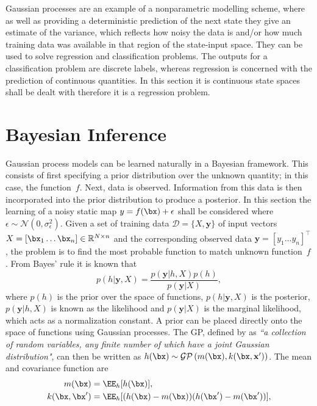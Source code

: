 Gaussian processes are an example of a nonparametric modelling scheme, where as well as providing a deterministic prediction of the next state they give an estimate of the variance, which reflects how noisy the data is and/or how much training data was available in that region of the state-input space. They can be used to solve regression and classification problems. The outputs for a classification problem are discrete labels, whereas regression is concerned with the prediction of continuous quantities. In this section it is continuous state spaces shall be dealt with therefore it is a regression problem.

\section{Bayesian Inference}
Gaussian process models can be learned naturally in a Bayesian framework. This consists of first specifying a prior distribution over the unknown quantity; in this case, the function~$f$. Next, data is observed. Information from this data is then incorporated into the prior distribution to produce a posterior. In this section the learning of a noisy static map $y = f(\bx) + \epsilon$ shall be considered where $\epsilon \sim \mathcal{N}(0,\sigma^2_\epsilon)$. Given a set of training data $\mathcal{D}=\{X,\mathbf{y}\}$ of input vectors $X=[\bx_1\dots\bx_n] \in \mathbb{R}^{N\times n}$ and the corresponding observed data $\mathbf{y}=[y_1\dots y_n]^\top$, the problem is to find the most probable function to match unknown function~$f$. From Bayes' rule it is known that
\begin{equation}\label{posterior}
p(h|\mathbf{y},X) = 
\frac{p(\mathbf{y}|h,X)p(h)}
        {p(\mathbf{y}|X)},
\end{equation}
where $p(h)$ is the prior over the space of functions, $p(h|\mathbf{y},X)$ is the posterior, $p(\mathbf{y}|h,X)$ is known as the likelihood and $p(\mathbf{y}|X)$ is the marginal likelihood, which acts as a normalization constant. A prior can be placed directly onto the space of functions using Gaussian processes. The GP, defined by \cite{RaWi06} as \textit{``a collection of random variables, any finite number of which have a joint Gaussian distribution"}, can then be written as $h(\bx) \sim \mathcal{GP}\left(m(\bx), k(\bx,\mathbf{x'}) \right)$. The mean and covariance function are
\begin{align}
m(\bx) &= \EE_h[h(\bx)], \\
k(\bx,\bx') &= \EE_h[(h(\bx) - m(\bx)) (h(\bx') - m(\bx'))],
\end{align}
